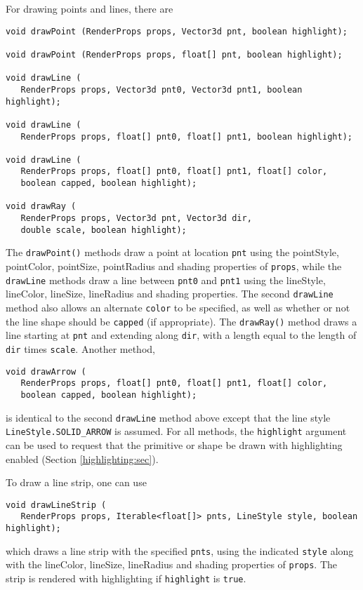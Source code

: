 For drawing points and lines, there are
%
\begin{lstlisting}[]
void drawPoint (RenderProps props, Vector3d pnt, boolean highlight);

void drawPoint (RenderProps props, float[] pnt, boolean highlight);

void drawLine (
   RenderProps props, Vector3d pnt0, Vector3d pnt1, boolean highlight);

void drawLine (
   RenderProps props, float[] pnt0, float[] pnt1, boolean highlight);

void drawLine (
   RenderProps props, float[] pnt0, float[] pnt1, float[] color, 
   boolean capped, boolean highlight);

void drawRay (
   RenderProps props, Vector3d pnt, Vector3d dir, 
   double scale, boolean highlight);
\end{lstlisting}
%
The {\tt drawPoint()} methods draw a point at location {\tt pnt} using the {\sf
pointStyle}, {\sf pointColor}, {\sf pointSize}, {\sf pointRadius} and
{\sf shading} properties of {\tt props}, while the {\tt drawLine}
methods draw a line between {\tt pnt0} and {\tt pnt1} using the {\sf
lineStyle}, {\sf lineColor}, {\sf lineSize}, {\sf lineRadius} and {\sf
shading} properties. The second {\tt drawLine} method also allows an
alternate {\tt color} to be specified, as well as whether or not the
line shape should be {\tt capped} (if appropriate). The {\tt drawRay()}
method draws a line starting at {\tt pnt} and extending along {\tt dir},
with a length equal to the length of {\tt dir} times {\tt scale}.
Another method,
%
\begin{lstlisting}[]
void drawArrow (
   RenderProps props, float[] pnt0, float[] pnt1, float[] color, 
   boolean capped, boolean highlight);
\end{lstlisting}
%
is identical to the second {\tt drawLine} method above except that the line
style {\tt LineStyle.SOLID\_ARROW} is assumed. For all methods, the
{\tt highlight} argument can be used to request that the primitive
or shape be
drawn with highlighting enabled (Section
\ref{highlighting:sec}).

To draw a line strip, one can use
%
\begin{lstlisting}[]
void drawLineStrip (
   RenderProps props, Iterable<float[]> pnts, LineStyle style, boolean highlight);
\end{lstlisting}
%
which draws a line strip with the specified {\tt pnts}, using the
indicated {\tt style} along with the {\sf lineColor}, {\sf lineSize},
{\sf lineRadius} and {\sf shading} properties of {\tt props}. The
strip is rendered with highlighting if {\tt highlight} is {\tt true}.

